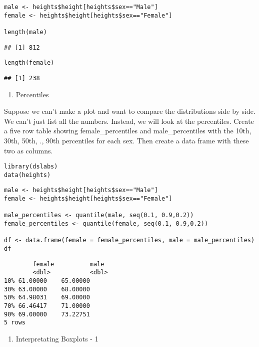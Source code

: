 \documentclass[]{article}
\providecommand{\tightlist}{%
  \setlength{\itemsep}{0pt}\setlength{\parskip}{0pt}}
\begin{document}
\begin{verbatim}
male <- heights$height[heights$sex=="Male"]
female <- heights$height[heights$sex=="Female"]

length(male)
\end{verbatim}

\begin{verbatim}
## [1] 812
\end{verbatim}

\begin{verbatim}
length(female)
\end{verbatim}

\begin{verbatim}
## [1] 238
\end{verbatim}

\begin{enumerate}
\def\labelenumi{\arabic{enumi}.}
\setcounter{enumi}{1}
\tightlist
\item
  Percentiles
\end{enumerate}

Suppose we can't make a plot and want to compare the distributions side
by side. We can't just list all the numbers. Instead, we will look at
the percentiles. Create a five row table showing female\_percentiles and
male\_percentiles with the 10th, 30th, 50th, ., 90th percentiles for
each sex. Then create a data frame with these two as columns.

\begin{verbatim}
library(dslabs)
data(heights)
\end{verbatim}

\begin{verbatim}
male <- heights$height[heights$sex=="Male"]
female <- heights$height[heights$sex=="Female"]

male_percentiles <- quantile(male, seq(0.1, 0.9,0.2))
female_percentiles <- quantile(female, seq(0.1, 0.9,0.2))

df <- data.frame(female = female_percentiles, male = male_percentiles)
df
\end{verbatim}

\begin{verbatim}
        female          male
        <dbl>           <dbl>
10% 61.00000    65.00000
30% 63.00000    68.00000
50% 64.98031    69.00000
70% 66.46417    71.00000
90% 69.00000    73.22751
5 rows
\end{verbatim}

\begin{enumerate}
\def\labelenumi{\arabic{enumi}.}
\setcounter{enumi}{2}
\tightlist
\item
  Interpretating Boxplots - 1
\end{enumerate}
\end{document}
